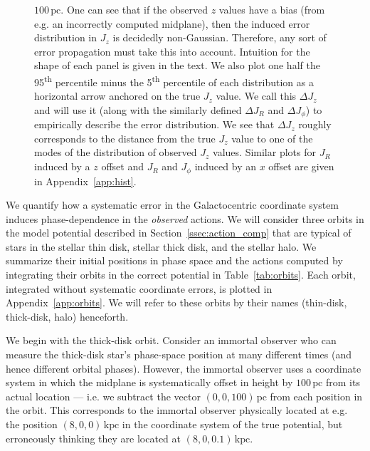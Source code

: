 \documentclass[twocolumn]{aastex62}
\newcommand{\pc}{\text{pc}}
\newcommand{\kpc}{\text{kpc}}
\newcommand{\uth}{\textsuperscript{th}}
\begin{document}
\begin{figure}
{$100\,\pc$. One can see that if the observed $z$ values have a bias (from e.g.
an incorrectly computed midplane), then the induced error distribution in
$J_z$ is decidedly non-Gaussian. Therefore, any sort of error propagation must
take this into account. Intuition for the shape of each panel is given in the
text. We also plot one half the 95\uth{} percentile minus the 5\uth{}
percentile of each distribution as a horizontal arrow anchored on the true
$J_z$ value. We call this $\Delta J_z$ and will use it (along with the
similarly defined $\Delta J_R$ and $\Delta J_{\phi}$) to empirically describe
the error distribution. We see that $\Delta J_z$ roughly corresponds to the
distance from the true $J_z$ value to one of the modes of the distribution of
observed $J_z$ values. Similar plots for $J_R$ induced by a $z$ offset and
$J_R$ and $J_{\phi}$ induced by an $x$ offset are given in
Appendix~\ref{app:hist}.}
\label{fig:Jz_hist}
\end{figure}

We quantify how a systematic error in the Galactocentric coordinate system
induces phase-dependence in the \emph{observed} actions. We will consider
three orbits in the model potential described in
Section~\ref{ssec:action_comp} that are typical of stars in the stellar thin
disk, stellar thick disk, and the stellar halo. We summarize their initial
positions in phase space and the actions computed by integrating their orbits
in the correct potential in Table~\ref{tab:orbits}. Each orbit, integrated
without systematic coordinate errors, is plotted in Appendix~\ref{app:orbits}.
We will refer to these orbits by their names (thin-disk, thick-disk, halo)
henceforth.

We begin with the thick-disk orbit. Consider an immortal observer who can
measure the thick-disk star's phase-space position at many different times
(and hence different orbital phases). However, the immortal observer uses a
coordinate system in which the midplane is systematically offset in height by
$100\,\pc$ from its actual location --- i.e. we subtract the vector $(0, 0,
100)\,\pc$ from each position in the orbit. This corresponds to the immortal
observer physically located at e.g. the position $(8, 0, 0)\,\kpc$ in the
coordinate system of the true potential, but erroneously thinking they are
located at $(8, 0, 0.1)\,\kpc$.
\end{document}
